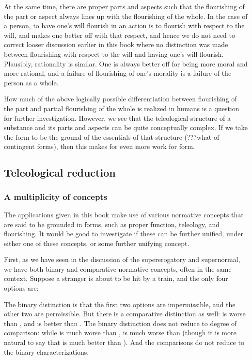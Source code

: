 At the same time, there are proper parts and aspects such that the flourishing of the part or aspect always lines up with the
flourishing of the whole. In the case of a person, to have one's will flourish in an action is to flourish with respect to the 
will, and makes one better off with that respect, and hence we do not need to correct looser discussion earlier in this book where
no distinction was made between flourishing with respect to the will and having one's will flourish. Plausibly, rationality is similar. 
One is always better off for being more moral and more rational, and a failure of flourishing of one's morality is a failure of the 
person as a whole. 

How much of the above logically possible differentiation between flourishing of the part and partial flourishing of the whole is 
realized in humans is a question for further investigation. However,
we see that the teleological structure of a substance and its parts and aspects can be quite conceptually complex. If we take
the form to be the ground of the essentials of that structure (???what of contingent forms), then this makes for even more work 
for form.


\subsection{Teleological reduction}
\subsubsection{A multiplicity of concepts}
The applications given in this book make use of various normative concepts that are said to be grounded in forms,
such as proper function, teleology, and flourishing. It would be good to investigate if these 
can be further unified, under either one of these concepts, or some further unifying concept.

First, as we have seen in the discussion of the supererogatory and supernormal, we have both binary and comparative normative 
concepts, often in the same context. Suppose a stranger is about to be hit by a train, and the only four options are:


The binary distinction is that
the first two options are impermissible, and the other two are permissible. But there is a comparative distinction
as well:  is worse than , and  is better than . The binary distinction does not reduce to
degree of comparison: while  is much worse than ,  is much worse than  (though 
it is more natural to say that  is much better than ). And the comparisons do not reduce to the binary 
characterizations.

